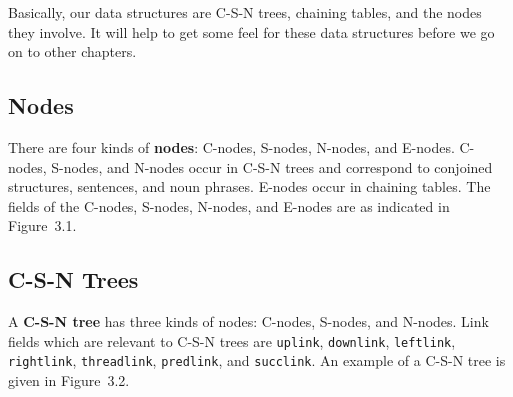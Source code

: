 \documentclass{article}
\begin{document}
\bigbreak

Basically, our data structures are C-S-N trees, chaining tables,
and the nodes they involve. It will help to get some feel for
these data structures before we go on to other chapters.


\subsection{Nodes}

There are four kinds of \textbf{nodes}: C-nodes, S-nodes,
N-nodes, and E-nodes. C-nodes, S-nodes, and N-nodes occur in
C-S-N trees and correspond to conjoined structures, sentences,
and noun phrases. E-nodes occur in chaining tables. The fields
of the C-nodes, S-nodes, N-nodes, and E-nodes are as indicated
in Figure~3.1.


\subsection{C-S-N Trees}

A \textbf{C-S-N tree} has three kinds of nodes: C-nodes,
S-nodes, and N-nodes. Link fields which are relevant to C-S-N
trees are \texttt{uplink}, \texttt{downlink}, \texttt{leftlink},
\texttt{rightlink}, \texttt{threadlink}, \texttt{predlink}, and
\texttt{succlink}. An example of a C-S-N tree is given in
Figure~3.2.
\end{document}

